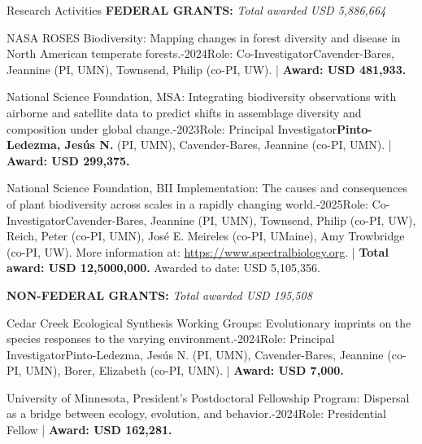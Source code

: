 \documentclass{resume} %
\begin{document}
\begin{rSection}{Research Activities}
\textbf{FEDERAL GRANTS:} \hfill {\em Total awarded USD 5,886,664}

\begin{pSubsection}{NASA ROSES Biodiversity: }{\normalfont Mapping changes in forest diversity and disease in North American temperate forests.}{-2024}{\normalfont Role: Co-Investigator}{\normalfont Cavender-Bares, Jeannine (PI, UMN), Townsend, Philip (co-PI, UW). | {\bf Award: USD 481,933.}}
\end{pSubsection}

\begin{pSubsection}{National Science Foundation, MSA: }{\normalfont Integrating biodiversity observations with airborne and satellite data to predict shifts in assemblage diversity and composition under global change.}{-2023}{\normalfont Role: Principal Investigator}{}{{\bf Pinto-Ledezma, Jesús N.} \normalfont (PI, UMN), Cavender-Bares, Jeannine (co-PI, UMN). | {\bf Award: USD 299,375.}}
\end{pSubsection}

\begin{pSubsection}{National Science Foundation, BII Implementation: }{\normalfont The causes and consequences of plant biodiversity across scales in a rapidly changing world.}{-2025}{\normalfont Role: Co-Investigator}{\normalfont Cavender-Bares, Jeannine (PI, UMN), Townsend, Philip (co-PI, UW), Reich, Peter (co-PI, UMN), José E. Meireles (co-PI, UMaine), Amy Trowbridge (co-PI, UW). More information at: \url{https://www.spectralbiology.org}. | {\bf Total award: USD 12,5000,000.} Awarded to date: USD 5,105,356.}
\end{pSubsection}

\textbf{NON-FEDERAL GRANTS:}  \hfill {\em Total awarded USD 195,508}

\begin{pSubsection}{Cedar Creek Ecological Synthesis Working Groups: }{\normalfont Evolutionary imprints on the species responses to the varying environment.}{-2024}{\normalfont Role: Principal Investigator}{Pinto-Ledezma, Jesús N. \normalfont (PI, UMN), Cavender-Bares, Jeannine (co-PI, UMN), Borer, Elizabeth (co-PI, UMN).}{ | {\bf Award: USD 7,000.}}
\end{pSubsection}

\begin{pSubsection}{University of Minnesota, President's Postdoctoral Fellowship Program: }{\normalfont Dispersal as a bridge between ecology, evolution, and behavior.}{-2024}{\normalfont Role: Presidential Fellow}{ | {\bf Award: USD 162,281.}}
\end{pSubsection}


\end{rSection}
\end{document}
